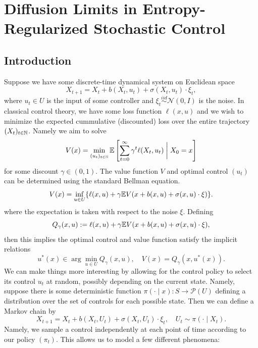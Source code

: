 \chapter{Diffusion Limits in Entropy-Regularized Stochastic Control}

\section{Introduction}

Suppose we have some discrete-time dynamical system on Euclidean space
%
\[X_{t+1} = X_t + b(X_t, u_t) + \sigma(X_t, u_t) \cdot \xi_t,\]
%
where $u_t \in U$ is the input of some controller and $\xi_t \overset{iid}{\sim} \mathcal{N}(0, I)$ is the noise. In classical control theory,
we have some loss function $\ell(x,u)$ and we wish to minimize the expected cummulative (discounted) loss over the entire trajectory $(X_t)_{t \in \mathbb{N}}$.
Namely we aim to solve
%
\[V(x) = \min_{(u_t)_{t \in \mathbb{N}}} \mathbb{E}\left[ \sum_{t=0}^\infty \gamma^t \ell(X_t, u_t) \;\bigg\vert\; X_0 = x\right]\]
%
\noindent for some discount $\gamma \in (0,1)$. The value function $V$ and optimal control $(u_t)$ can be determined
using the standard Bellman equation.
%
\[V(x) = \inf_{u \in U} \{\ell(x,u) + \gamma \mathbb{E} V(x + b(x,u) + \sigma(x,u) \cdot \xi)\}.\]
%
\noindent where the expectation is taken with respect to the noise $\xi$. Defining
%
\[Q_\gamma(x,u) := \ell(x,u) + \gamma \mathbb{E} V(x + b(x,u) + \sigma(x,u) \cdot \xi),\]
%
\noindent then this implies the optimal control and value function satisfy the implicit relations
%
\begin{equation}
	u^*(x) \in \arg\min_{u \in U} Q_\gamma(x,u), \quad V(x) = Q_\gamma(x, u^*(x)).
	\label{eqn:optimal_control_unregularized}
\end{equation}
%
We can make things more interesting by allowing for the control policy to select its control $u_t$ at random,
possibly depending on the current state. Namely, suppose there is some deterministic function $\pi(\cdot \mid x) : S \to \mathcal{P}(U)$ defining a
distribution over the set of controls for each possible state. Then we
can define a Markov chain by
%
\[X_{t+1} = X_t + b(X_t, U_t) + \sigma(X_t, U_t) \cdot \xi_t, \quad U_t \sim \pi(\cdot \mid X_t).\]
%
Namely, we sample a control independently at each point of time according to our policy $(\pi_t)$. This allows us to
model a few different phenomena:


